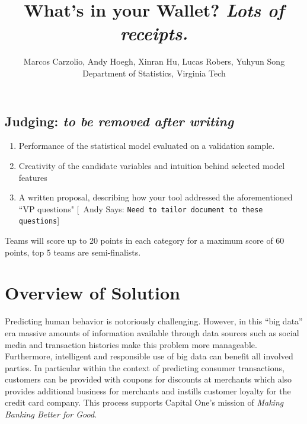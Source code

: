 \documentclass[12pt]{article} %
\begin{document}
\def\spacingset#1{\renewcommand{\baselinestretch}%
{#1}\small\normalsize} \spacingset{1}
\newcommand{\ac}[1]{[{\color{red}\ Andy Says: {\tt #1}}]}
\newcommand{\xc}[1]{[{\color{red}\ Xinran Says: {\tt #1}}]}
\newcommand{\lc}[1]{[{\color{red}\ Lucas Says: {\tt #1}}]}
\newcommand{\mc}[1]{[{\color{red}\ Marcos Says: {\tt #1}}]}
\newcommand{\yc}[1]{[{\color{red}\ Yuhyun Says: {\tt #1}}]}







  \title{\bf What's in your Wallet? \emph{ Lots of receipts.}}
  \author{Marcos Carzolio, Andy Hoegh, Xinran Hu, Lucas Robers, Yuhyun Song\\ Department of Statistics, Virginia Tech}
 \maketitle
\bigskip
\begin{abstract}
\noindent
\ac{Fill this in}
\end{abstract}

\subsection{Judging: \emph{to be removed after writing}}
\begin{enumerate}
\item Performance of the statistical model evaluated on a validation sample.
\item Creativity of the candidate variables and intuition behind selected model features
\item A written proposal, describing how your tool addressed the aforementioned ``VP questions" \ac{Need to tailor document to these questions}
\end {enumerate}
Teams will score up to 20 points in each category for a maximum score of 60 points, top 5 teams are semi-finalists.


\newpage


\section{Overview of Solution} 
Predicting human behavior is notoriously challenging.  However, in this ``big data'' era massive amounts of information available through data sources such as social media and transaction histories make this problem more manageable.  Furthermore, intelligent and responsible use of big data can benefit all involved parties.  In particular within the context of predicting consumer transactions, customers can be provided with coupons for discounts at merchants which also provides additional business for merchants and instills customer loyalty for the credit card company.  This process supports Capital One's mission of \emph{Making Banking Better for Good}.  
\end{document}
